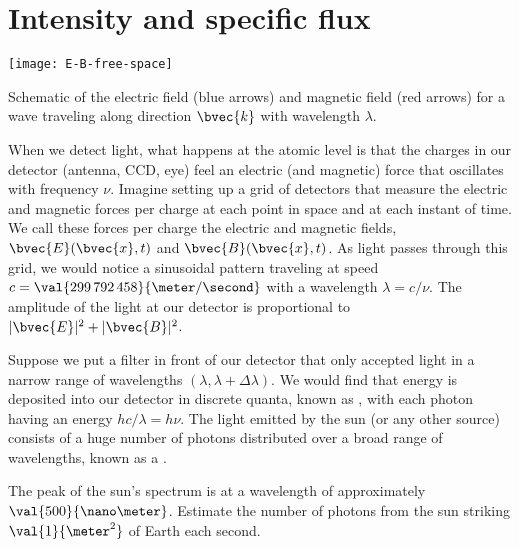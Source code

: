 \section{Intensity and specific flux}
\label{s.intensity-specific-flux}

\begin{marginfigure}
\texttt{[image: E-B-free-space]}
\caption[The electric force in a light wave]{Schematic of the electric field (blue arrows) and magnetic field (red arrows) for a wave traveling along direction $\bvec{k}$ with wavelength $\lambda$.}
\label{f.light-wave}
\end{marginfigure}
When we detect light, what happens at the atomic level is that the charges in our detector (antenna, CCD, eye) feel an electric (and magnetic) force that oscillates with frequency $\nu$. Imagine setting up a grid of detectors that measure the electric and magnetic forces per charge at each point in space and at each instant of time. We call these forces per charge the electric and magnetic fields, $\bvec{E}(\bvec{x},t)$ and $\bvec{B}(\bvec{x},t)$. As light passes through this grid, we would notice a sinusoidal pattern traveling at speed $c = \val{299\,792\,458}{\meter/\second}$ with a wavelength $\lambda = c/\nu$.  The amplitude of the light at our detector is proportional to $|\bvec{E}|^{2} + |\bvec{B}|^{2}$. 

Suppose we put a filter in front of our detector that only accepted light in a narrow range of wavelengths $(\lambda,\lambda+\Delta\lambda)$. We would find that energy is deposited into our detector in discrete quanta, known as , with each photon having an energy $hc/\lambda = h\nu$. The light emitted by the sun (or any other source) consists of a huge number of photons distributed over a broad range of wavelengths, known as a .

\begin{exercisebox}
The peak of the sun's spectrum is at a wavelength of approximately $\val{500}{\nano\meter}$. Estimate the number of photons from the sun striking $\val{1}{\meter^{2}}$ of Earth each second.
\end{exercisebox}

